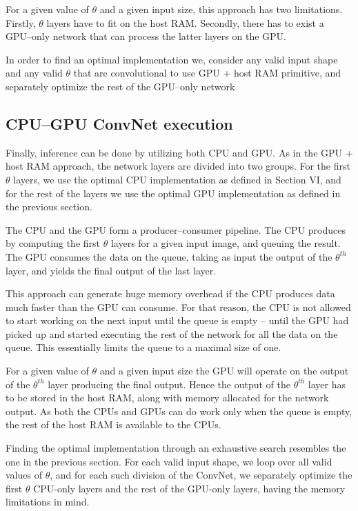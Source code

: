 \documentclass[conference]{./IEEEtran}
\begin{document}
  For a given value of $\theta$ and a given input size, this approach
  has two limitations.  Firstly, $\theta$ layers have to fit on the
  host RAM.  Secondly, there has to exist a GPU--only network that can
  process the latter layers on the GPU.

  In order to find an optimal implementation we, consider any valid
  input shape and any valid $\theta$ that are convolutional to use GPU
  + host RAM primitive, and separately optimize the rest of the
  GPU--only network

\subsection{CPU--GPU ConvNet execution}

  Finally, inference can be done by utilizing both CPU and GPU.  As in
  the GPU + host RAM approach, the network layers are divided into two
  groups.  For the first $\theta$ layers, we use the optimal CPU
  implementation as defined in Section VI, and for the rest of the
  layers we use the optimal GPU implementation as defined in the
  previous section.

  The CPU and the GPU form a producer--consumer pipeline.  The CPU
  produces by computing the first $\theta$ layers for a given input
  image, and queuing the result.  The GPU consumes the data on the
  queue, taking as input the output of the $\theta^{th}$ layer, and
  yields the final output of the last layer.

  This approach can generate huge memory overhead if the CPU produces
  data much faster than the GPU can consume.  For that reason, the CPU
  is not allowed to start working on the next input until the queue is
  empty -- until the GPU had picked up and started executing the rest
  of the network for all the data on the queue.  This essentially
  limits the queue to a maximal size of one.

  For a given value of $\theta$ and a given input size the GPU will
  operate on the output of the $\theta^{th}$ layer producing the final
  output.  Hence the output of the $\theta^{th}$ layer has to be
  stored in the host RAM, along with memory allocated for the network
  output.  As both the CPUs and GPUs can do work only when the queue
  is empty, the rest of the host RAM is available to the CPUs.

  Finding the optimal implementation through an exhaustive search
  resembles the one in the previous section.  For each valid input
  shape, we loop over all valid values of $\theta$, and for each such
  division of the ConvNet, we separately optimize the first $\theta$
  CPU-only layers and the rest of the GPU-only layers, having the
  memory limitations in mind.
\end{document}
